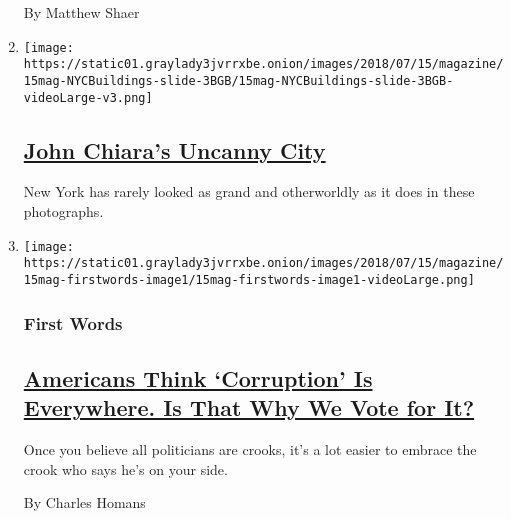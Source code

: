 \begin{enumerate}
  By Matthew Shaer
\item
  \texttt{[image: https://static01.graylady3jvrrxbe.onion/images/2018/07/15/magazine/15mag-NYCBuildings-slide-3BGB/15mag-NYCBuildings-slide-3BGB-videoLarge-v3.png]}

  \hypertarget{john-chiaras-uncanny-city}{%
  \subsection{\texorpdfstring{\href{/interactive/2018/07/12/magazine/john-chiara-uncanny-city-photography.html}{John
  Chiara's Uncanny
  City}}{John Chiara's Uncanny City}}\label{john-chiaras-uncanny-city}}

  New York has rarely looked as grand and otherworldly as it does in
  these photographs.
\item
  \texttt{[image: https://static01.graylady3jvrrxbe.onion/images/2018/07/15/magazine/15mag-firstwords-image1/15mag-firstwords-image1-videoLarge.png]}

  \hypertarget{first-words}{%
  \subsubsection{First Words}\label{first-words}}

  \hypertarget{americans-think-corruption-is-everywhere-is-that-why-we-vote-for-it}{%
  \subsection{\texorpdfstring{\href{/2018/07/10/magazine/americans-think-corruption-is-everywhere-is-that-why-we-vote-for-it.html}{Americans
  Think `Corruption' Is Everywhere. Is That Why We Vote for
  It?}}{Americans Think `Corruption' Is Everywhere. Is That Why We Vote for It?}}\label{americans-think-corruption-is-everywhere-is-that-why-we-vote-for-it}}

  Once you believe all politicians are crooks, it's a lot easier to
  embrace the crook who says he's on your side.

  By Charles Homans
\end{enumerate}

